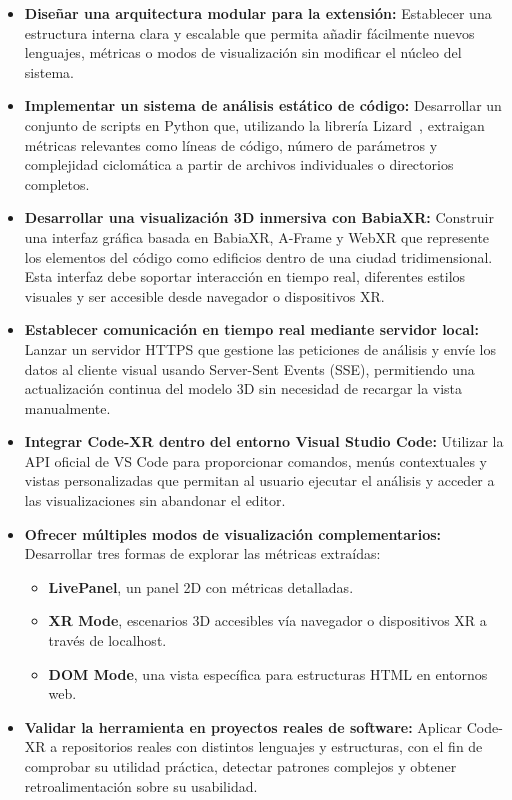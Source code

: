 \documentclass[a4paper, 12pt]{book}
\begin{document}
\begin{itemize}
    \item \textbf{Diseñar una arquitectura modular para la extensión:} Establecer una estructura interna clara y escalable que permita añadir fácilmente nuevos lenguajes, métricas o modos de visualización sin modificar el núcleo del sistema.
    \item \textbf{Implementar un sistema de análisis estático de código:} Desarrollar un conjunto de scripts en Python que, utilizando la librería Lizard~\cite{lizard}, extraigan métricas relevantes como líneas de código, número de parámetros y complejidad ciclomática a partir de archivos individuales o directorios completos.
    \item \textbf{Desarrollar una visualización 3D inmersiva con BabiaXR:} Construir una interfaz gráfica basada en BabiaXR, A-Frame y WebXR que represente los elementos del código como edificios dentro de una ciudad tridimensional. Esta interfaz debe soportar interacción en tiempo real, diferentes estilos visuales y ser accesible desde navegador o dispositivos XR.
    \item \textbf{Establecer comunicación en tiempo real mediante servidor local:} Lanzar un servidor HTTPS que gestione las peticiones de análisis y envíe los datos al cliente visual usando Server-Sent Events (SSE), permitiendo una actualización continua del modelo 3D sin necesidad de recargar la vista manualmente.
    \item \textbf{Integrar Code-XR dentro del entorno Visual Studio Code:} Utilizar la API oficial de VS Code para proporcionar comandos, menús contextuales y vistas personalizadas que permitan al usuario ejecutar el análisis y acceder a las visualizaciones sin abandonar el editor.
    \item \textbf{Ofrecer múltiples modos de visualización complementarios:} Desarrollar tres formas de explorar las métricas extraídas:
    \begin{itemize}
        \item \textbf{LivePanel}, un panel 2D con métricas detalladas.
        \item \textbf{XR Mode}, escenarios 3D accesibles vía navegador o dispositivos XR a través de localhost.
        \item \textbf{DOM Mode}, una vista específica para estructuras HTML en entornos web.
    \end{itemize}
    \item \textbf{Validar la herramienta en proyectos reales de software:} Aplicar Code-XR a repositorios reales con distintos lenguajes y estructuras, con el fin de comprobar su utilidad práctica, detectar patrones complejos y obtener retroalimentación sobre su usabilidad.
\end{itemize}
\end{document}
